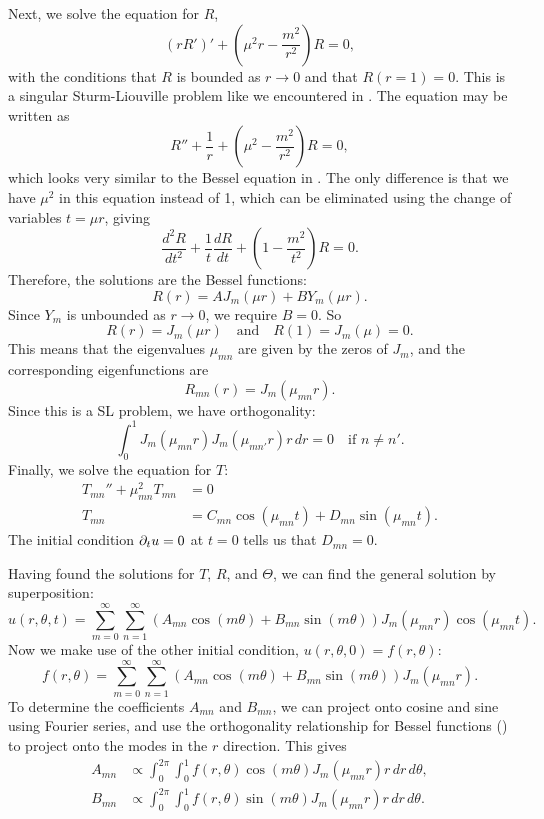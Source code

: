 \begin{enumerate}
	Next, we solve the equation for $R$,
	\[
	(rR')' + \left(\mu^2r - \frac{m^2}{r^2}\right)R = 0,
	\]
	with the conditions that $R$ is bounded as $r\to 0$ and that $R(r=1)=0$. This is a singular Sturm-Liouville problem like we encountered in . The equation may be written as
	\[
	R'' + \frac{1}{r} + \left(\mu^2 - \frac{m^2}{r^2}\right)R = 0,
	\]
	which looks very similar to the Bessel equation in . The only difference is that we have $\mu^2$ in this equation instead of 1, which can be eliminated using the change of variables $t= \mu r$, giving
	\[
	\frac{d^2R}{dt^2} + \frac{1}{t} \frac{dR}{dt} + \left(1- \frac{m^2}{t^2}\right)R = 0.
	\]
	Therefore, the solutions are the Bessel functions:
	\[
	R(r) = AJ_m(\mu r) + BY_m(\mu r).
	\]
	Since $Y_m$ is unbounded as $r \to 0$, we require $B=0$. So
	\[
	R(r) = J_m(\mu r) \quad\text{and}\quad R(1) = J_m(\mu) = 0.
	\]
	This means that the eigenvalues $\mu_{mn}$ are given by the zeros of $J_m$, and the corresponding eigenfunctions are
	\[
	R_{mn}(r) = J_m(\mu_{mn}r).
	\]
	Since this is a SL problem, we have orthogonality:
	\begin{equation}\label{eq:slorthog}
		\int_0^1 J_m(\mu_{mn}r) J_m(\mu_{mn'}r) r \,dr = 0 \quad\text{if } n \neq n'.
	\end{equation}
	Finally, we solve the equation for $T$:
	\begin{align*}
		T_{mn}'' + \mu_{mn}^2 T_{mn} &= 0 \\
		T_{mn} &= C_{mn}\cos(\mu_{mn}t) + D_{mn}\sin(\mu_{mn}t).
	\end{align*}
	The initial condition $\partial_tu = 0$ at $t=0$ tells us that $D_{mn}=0$.
	
	Having found the solutions for $T$, $R$, and $\Theta$, we can find the general solution by superposition:
	\[
	u(r,\theta,t) = \sum_{m=0}^{\infty} \sum_{n=1}^{\infty} \left(A_{mn}\cos(m\theta) + B_{mn}\sin(m\theta)\right) J_m(\mu_{mn}r) \cos(\mu_{mn}t).
	\]
	Now we make use of the other initial condition, $u(r,\theta,0) = f(r,\theta)$:
	\[
	f(r,\theta) = \sum_{m=0}^{\infty} \sum_{n=1}^{\infty} \left(A_{mn}\cos(m\theta) + B_{mn}\sin(m\theta)\right) J_m(\mu_{mn}r).
	\]
	To determine the coefficients $A_{mn}$ and $B_{mn}$, we can project onto cosine and sine using Fourier series, and use the orthogonality relationship for Bessel functions () to project onto the modes in the $r$ direction. This gives
	\begin{align}
		\label{eq:wave2ddiscprop1}
		A_{mn} &\propto \int_0^{2\pi} \int_0^1 f(r,\theta) \cos(m\theta) J_m(\mu_{mn}r) r \,dr\,d\theta, \\
		\label{eq:wave2ddiscprop2}
		B_{mn} &\propto \int_0^{2\pi} \int_0^1 f(r,\theta) \sin(m\theta) J_m(\mu_{mn}r) r \,dr\,d\theta.
	\end{align}
	

\end{enumerate}
